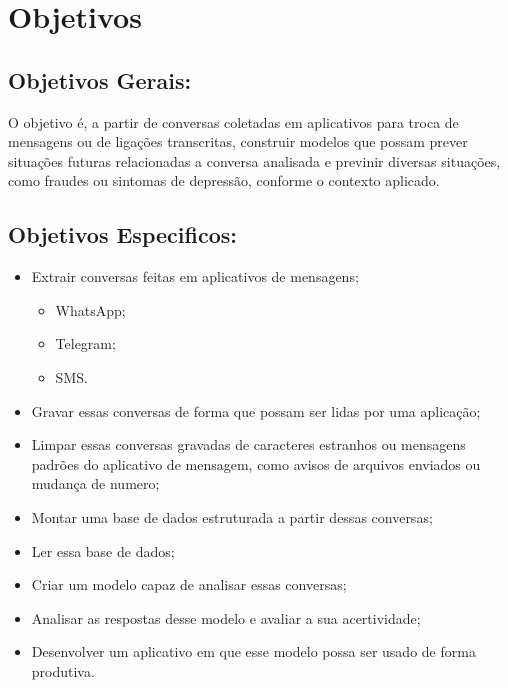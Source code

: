 \documentclass[a4paper, 12pt]{article}
\begin{document}
  \tableofcontents{}
  \break

  \section{Objetivos}

    \subsection{Objetivos Gerais:}

    \hfill\newline
    O objetivo é, a partir de conversas coletadas em aplicativos para troca de mensagens ou de ligações transcritas, construir modelos que possam prever situações futuras relacionadas a conversa analisada e previnir diversas situações, como fraudes ou sintomas de depressão, conforme o contexto aplicado.

    \hfill\newline
    \subsection{Objetivos Especificos:}

    \begin{itemize}
        \item Extrair conversas feitas em aplicativos de mensagens;
          \begin{itemize}
            \item WhatsApp;
            \item Telegram;
            \item SMS.
          \end{itemize}
        \item Gravar essas conversas de forma que possam ser lidas por uma aplicação;
        \item Limpar essas conversas gravadas de caracteres estranhos ou mensagens padrões do aplicativo de mensagem, como avisos de arquivos enviados ou mudança de numero;
        \item Montar uma base de dados estruturada a partir dessas conversas;
        \item Ler essa base de dados;
        \item Criar um modelo capaz de analisar essas conversas;
        \item Analisar as respostas desse modelo e avaliar a sua acertividade;
        \item Desenvolver um aplicativo em que esse modelo possa ser usado de forma produtiva.
      \end{itemize}
\end{document}
